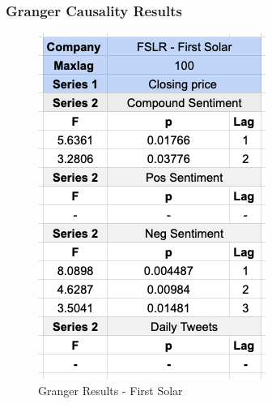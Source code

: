 \documentclass[sigconf, nonacm]{acmart}
\begin{document}
\subsubsection{Granger Causality Results}

\begin{figure}[H]
  \centering
  \includegraphics[width=0.7\linewidth]{granger_results/granger_first_solar.png}
  \caption{Granger Results - First Solar}
  \label{granger_first_solar}
\end{figure}
\end{document}
